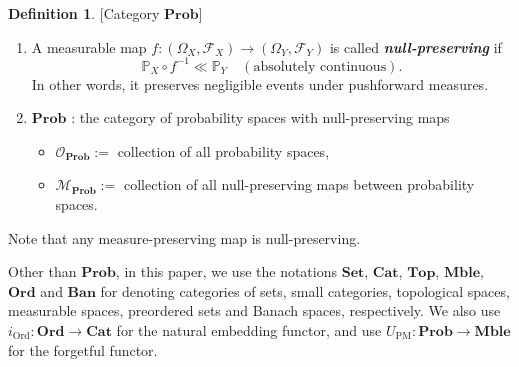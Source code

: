 \documentclass[12pt, a4paper]{amsart}
\theoremstyle{plain}
\theoremstyle{definition}
\newtheorem{defn}[thm]{Definition}
\numberwithin{figure}{section}
\numberwithin{table}{section}
\newcommand{\lspace} {
  \vspace{0.8\baselineskip}
}
\newcommand{\newword}[1]{\textbf{\textit{#1}}}
\numberwithin{equation}{section}
\newcommand{\Prob}{\mathbf{Prob}}
\newcommand{\Set}{\mathbf{Set}}
\newcommand{\Cat}{\mathbf{Cat}}
\newcommand{\Ord}{\mathbf{Ord}}
\newcommand{\Ban}{\mathbf{Ban}} %
\newcommand{\Top}{\mathbf{Top}}
\newcommand{\Mble}{\mathbf{Mble}}
\begin{document}
\begin{defn}{[Category $\Prob$]}
\label{defn:nullPres}
\begin{enumerate}
\item
A measurable map
$
f : 
(\Omega_X, \mathcal{F}_X)
	\to
(\Omega_Y, \mathcal{F}_Y)
$
is called
\newword{null-preserving}
if
\begin{equation}
\label{eq:nullPres}
\mathbb{P}_X \circ f^{-1}
	\ll
\mathbb{P}_Y
\quad
(\textrm{absolutely continuous}) .
\end{equation}
In other words,
it preserves negligible events under pushforward measures.

\item
$
\Prob
$
:
the category of probability spaces with null-preserving maps
\begin{itemize}
  \item
    $
    \mathcal{O}_{\Prob}
     :=
    $
    collection of all probability spaces,

  \item
    $
    \mathcal{M}_{\Prob}
     :=
    $
    collection of all null-preserving maps between probability spaces.
\end{itemize}

\end{enumerate}
\end{defn}


Note that any measure-preserving map is null-preserving.

\lspace

Other than $\Prob$,
in this paper,
we use the notations
$\Set$,
$\Cat$,
$\Top$,
$\Mble$,
$\Ord$
and
$\Ban$
for denoting categories of
sets,
small categories,
topological spaces,
measurable spaces,
preordered sets
and
Banach spaces,
respectively.
%
We also use
$
i_{\mathrm{Ord}}
	:
\Ord
	\to
\Cat
$
for the natural embedding functor,
and use
$
U_{\mathrm{PM}}
	:
\Prob
	\to
\Mble
$
for the forgetful functor.
\end{document}
